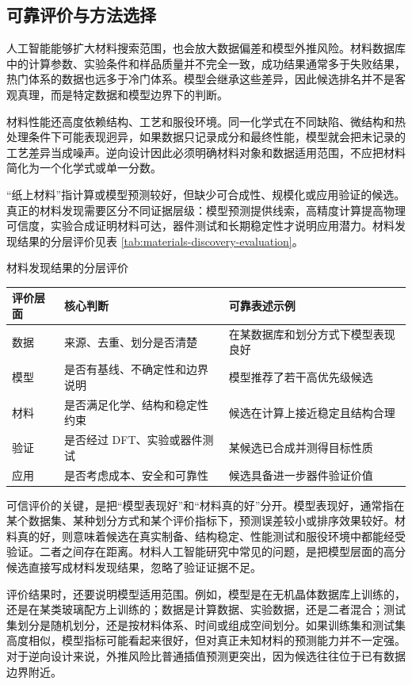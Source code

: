\subsection{可靠评价与方法选择}

人工智能能够扩大材料搜索范围，也会放大数据偏差和模型外推风险。材料数据库中的计算参数、实验条件和样品质量并不完全一致，成功结果通常多于失败结果，热门体系的数据也远多于冷门体系。模型会继承这些差异，因此候选排名并不是客观真理，而是特定数据和模型边界下的判断。


材料性能还高度依赖结构、工艺和服役环境。同一化学式在不同缺陷、微结构和热处理条件下可能表现迥异，如果数据只记录成分和最终性能，模型就会把未记录的工艺差异当成噪声。逆向设计因此必须明确材料对象和数据适用范围，不应把材料简化为一个化学式或单一分数。


“纸上材料”指计算或模型预测较好，但缺少可合成性、规模化或应用验证的候选。真正的材料发现需要区分不同证据层级：模型预测提供线索，高精度计算提高物理可信度，实验合成证明材料可达，器件测试和长期稳定性才说明应用潜力。材料发现结果的分层评价见表 \ref{tab:materials-discovery-evaluation}。


\begin{formalTable}[htbp]
\caption{材料发现结果的分层评价}
\label{tab:materials-discovery-evaluation}
\begin{tabularx}{\textwidth}{@{}YYY@{}}
\toprule
\textbf{评价层面} & \textbf{核心判断} & \textbf{可靠表述示例} \\
\midrule
数据 & 来源、去重、划分是否清楚 & 在某数据库和划分方式下模型表现良好 \\
模型 & 是否有基线、不确定性和边界说明 & 模型推荐了若干高优先级候选 \\
材料 & 是否满足化学、结构和稳定性约束 & 候选在计算上接近稳定且结构合理 \\
验证 & 是否经过 DFT、实验或器件测试 & 某候选已合成并测得目标性质 \\
应用 & 是否考虑成本、安全和可靠性 & 候选具备进一步器件验证价值 \\
\bottomrule
\end{tabularx}
\end{formalTable}

可信评价的关键，是把“模型表现好”和“材料真的好”分开。模型表现好，通常指在某个数据集、某种划分方式和某个评价指标下，预测误差较小或排序效果较好。材料真的好，则意味着候选在真实制备、结构稳定、性能测试和服役环境中都能经受验证。二者之间存在距离。材料人工智能研究中常见的问题，是把模型层面的高分候选直接写成材料发现结果，忽略了验证证据不足。

评价结果时，还要说明模型适用范围。例如，模型是在无机晶体数据库上训练的，还是在某类玻璃配方上训练的；数据是计算数据、实验数据，还是二者混合；测试集划分是随机划分，还是按材料体系、时间或组成空间划分。如果训练集和测试集高度相似，模型指标可能看起来很好，但对真正未知材料的预测能力并不一定强。对于逆向设计来说，外推风险比普通插值预测更突出，因为候选往往位于已有数据边界附近。

